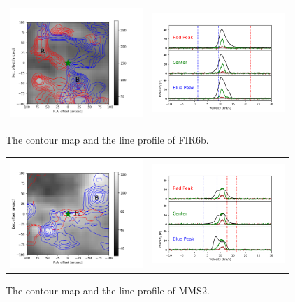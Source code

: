 \documentclass[twoside,11pt]{gshs_thesis}
\begin{document}
\begin{figure}[h!]
	\begin{center}
		\begin{tabular}{cc}
			\includegraphics[width=5cm]{Orion_12CO2-1_FIR6b_rbcontour_400_modified.png} &   \includegraphics[width=5cm]{Orion_12CO2-1_FIR6b_line_profile_400.png}\\
		\end{tabular}
		\caption{The contour map and the line profile of FIR6b. }
	\end{center}
\end{figure}

\begin{figure}[h!]
	\begin{center}
		\begin{tabular}{cc}
			\includegraphics[width=5cm]{Orion_12CO2-1_MMS2_rbcontour_400_modified.png} &   \includegraphics[width=5cm]{Orion_12CO2-1_MMS2_line_profile_400.png} \\
		\end{tabular}
		\caption{The contour map and the line profile of MMS2. }
	\end{center}
\end{figure}
\end{document}
